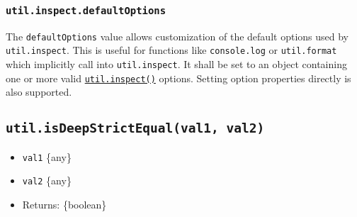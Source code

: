 \subsubsection{\texorpdfstring{\texttt{util.inspect.defaultOptions}}{util.inspect.defaultOptions}}\label{util.inspect.defaultoptions}

The \texttt{defaultOptions} value allows customization of the default
options used by \texttt{util.inspect}. This is useful for functions like
\texttt{console.log} or \texttt{util.format} which implicitly call into
\texttt{util.inspect}. It shall be set to an object containing one or
more valid \hyperref[utilinspectobject-options]{\texttt{util.inspect()}}
options. Setting option properties directly is also supported.

\begin{Shaded}
\begin{Highlighting}[]
\OperatorTok{=} \NormalTok{(}\NormalTok{)}\OperatorTok{;}
\OperatorTok{=} \NormalTok{(}\NormalTok{)}\NormalTok{(}\NormalTok{)}\OperatorTok{;}

\OperatorTok{;} 
 \OperatorTok{=} \OperatorTok{;}
\OperatorTok{;} 
\end{Highlighting}
\end{Shaded}

\subsection{\texorpdfstring{\texttt{util.isDeepStrictEqual(val1,\ val2)}}{util.isDeepStrictEqual(val1, val2)}}\label{util.isdeepstrictequalval1-val2}

\begin{itemize}
\tightlist
\item
  \texttt{val1} \{any\}
\item
  \texttt{val2} \{any\}
\item
  Returns: \{boolean\}
\end{itemize}

